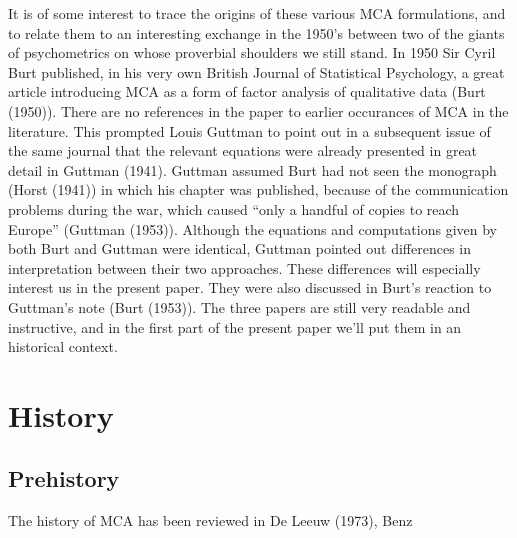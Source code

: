 \documentclass[
  12pt,
]{article}
\begin{document}
It is of some interest to trace the origins of these various MCA formulations, and to relate them to an interesting exchange in the 1950's between two of the giants of psychometrics on whose proverbial shoulders we still stand. In 1950 Sir Cyril Burt published, in his very own British Journal of Statistical Psychology, a great article introducing MCA as a form of factor analysis of qualitative data (Burt (1950)). There are no references in the paper to earlier occurances of MCA in the literature. This prompted Louis Guttman to point out in a subsequent issue of the same journal that the relevant equations were already presented in great detail in Guttman (1941). Guttman assumed Burt had not seen the monograph (Horst (1941)) in which his chapter was published, because of the communication problems during the war, which caused ``only a handful of copies to reach Europe'' (Guttman (1953)). Although the equations and computations given by both Burt and Guttman were identical, Guttman pointed out differences in interpretation between their two approaches. These differences will especially interest us in the present paper. They were also discussed in Burt's reaction to Guttman's note (Burt (1953)). The three papers are still very readable and instructive, and in the first part of the present paper we'll put them in an historical context.

\section{History}\label{history}

\subsection{Prehistory}\label{prehistory}

The history of MCA has been reviewed in De Leeuw (1973), Benz
\end{document}
